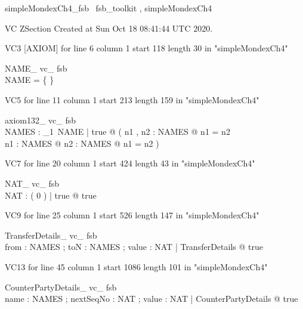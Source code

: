 \documentclass{article}
\begin{document}

\begin{zsection}	 \SECTION simpleMondexCh4\_fsb \parents~fsb\_toolkit , simpleMondexCh4
\end{zsection}

VC ZSection Created at Sun Oct 18 08:41:44 UTC 2020.

VC3 [AXIOM] for line 6 column 1 start 118 length 30 in "simpleMondexCh4"
\begin{theorem}{ NAME\_ vc\_ fsb}\\
 \lnot NAME = \{ \} \\

\end{theorem}

VC5 for line 11 column 1 start 213 length 159 in "simpleMondexCh4"
\begin{theorem}{ axiom132\_ vc\_ fsb}\\
 \exists NAMES : {\finset}_{1}~NAME | true @ ( \exists n1 , n2 : NAMES @ \lnot n1 = n2 \\
 \forall n1 : NAMES @ \exists n2 : NAMES @ \lnot n1 = n2 ) \\

\end{theorem}

VC7 for line 20 column 1 start 424 length 43 in "simpleMondexCh4"
\begin{theorem}{ NAT\_ vc\_ fsb}\\
 \exists NAT : \power ( 0  ) | true @ true \\

\end{theorem}

VC9 for line 25 column 1 start 526 length 147 in "simpleMondexCh4"
\begin{theorem}{ TransferDetails\_ vc\_ fsb}\\
 \exists from : NAMES ; toN : NAMES ; value : NAT | TransferDetails @ true \\

\end{theorem}

VC13 for line 45 column 1 start 1086 length 101 in "simpleMondexCh4"
\begin{theorem}{ CounterPartyDetails\_ vc\_ fsb}\\
 \exists name : NAMES ; nextSeqNo : NAT ; value : NAT | CounterPartyDetails @ true \\

\end{theorem}
\end{document}
